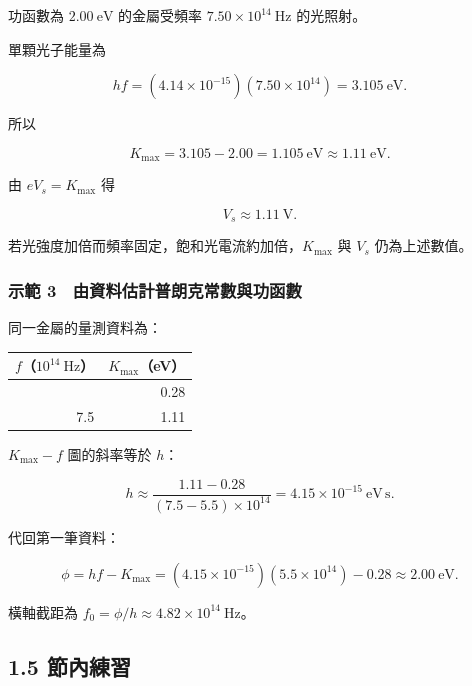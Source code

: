 \documentclass[11pt,a4paper]{article}
\newcounter{none}
\begin{document}
功函數為 \(2.00\ \mathrm{eV}\) 的金屬受頻率 \(7.50\times10^{14}\ \mathrm{Hz}\) 的光照射。

單顆光子能量為

\[
hf=(4.14\times10^{-15})(7.50\times10^{14})
=3.105\ \mathrm{eV}.
\]

所以

\[
K_{\max}=3.105-2.00=1.105\ \mathrm{eV}
\approx1.11\ \mathrm{eV}.
\]

由 \(eV_s=K_{\max}\) 得

\[
V_s\approx1.11\ \mathrm V.
\]

若光強度加倍而頻率固定，飽和光電流約加倍，\(K_{\max}\) 與 \(V_s\) 仍為上述數值。

\subsubsection{示範 3　由資料估計普朗克常數與功函數}\label{ux793aux7bc4-3-ux7531ux8cc7ux6599ux4f30ux8a08ux666eux6717ux514bux5e38ux6578ux8207ux529fux51fdux6578}

同一金屬的量測資料為：

{\def\LTcaptype{none} %
\begin{longtable}[]{@{}rr@{}}
\toprule\noalign{}
\(f\)（\(10^{14}\ \mathrm{Hz}\)） & \(K_{\max}\)（eV） \\
\midrule\noalign{}
\endhead
\bottomrule\noalign{}
\endlastfoot
5.5 & 0.28 \\
7.5 & 1.11 \\
\end{longtable}
}

\(K_{\max}-f\) 圖的斜率等於 \(h\)：

\[
h\approx
\frac{1.11-0.28}{(7.5-5.5)\times10^{14}}
=4.15\times10^{-15}\ \mathrm{eV\,s}.
\]

代回第一筆資料：

\[
\phi=hf-K_{\max}
=(4.15\times10^{-15})(5.5\times10^{14})-0.28
\approx2.00\ \mathrm{eV}.
\]

橫軸截距為 \(f_0=\phi/h\approx4.82\times10^{14}\ \mathrm{Hz}\)。

\subsection{1.5 節內練習}\label{ux7bc0ux5167ux7df4ux7fd2}
\end{document}
